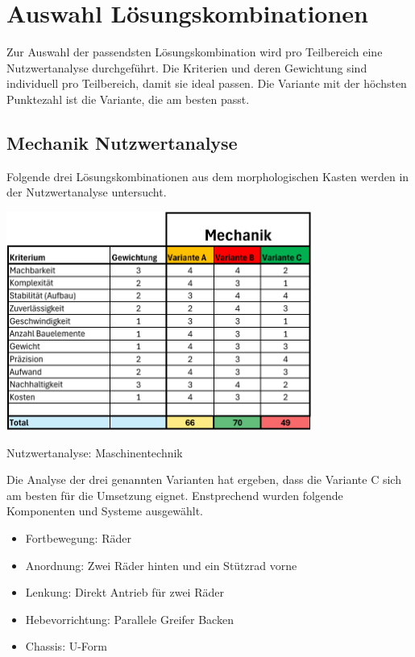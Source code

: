 \newpage
\section{Auswahl Lösungskombinationen}

Zur Auswahl der passendsten Lösungskombination wird pro Teilbereich eine Nutzwertanalyse durchgeführt. Die Kriterien und deren Gewichtung sind individuell pro Teilbereich, damit sie ideal passen. Die Variante mit der höchsten Punktezahl ist die Variante, die am besten passt.

\subsection{Mechanik Nutzwertanalyse}

Folgende drei Lösungskombinationen aus dem morphologischen Kasten werden in der Nutzwertanalyse untersucht. 



\begin{table}[H]
\centering
\includegraphics[width=0.75\textwidth]{assets/Nutzwertanalyse-M.pdf}
\caption{Nutzwertanalyse: Maschinentechnik}
\label{table:nutzwert-maschinentechnik}
\end{table}

Die Analyse der drei genannten Varianten hat ergeben, dass die Variante C sich am besten für die Umsetzung eignet. Enstprechend wurden folgende Komponenten und Systeme ausgewählt. 

\begin{itemize}
    \item Fortbewegung: Räder 
    \item Anordnung:  Zwei Räder hinten und ein Stützrad vorne
    \item Lenkung: Direkt Antrieb für zwei Räder
    \item Hebevorrichtung: Parallele Greifer Backen
    \item Chassis: U-Form 
\end{itemize}

